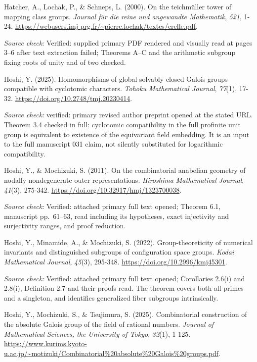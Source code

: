 \documentclass[10pt,a4paper]{article}
\begin{document}
Hatcher, A., Lochak, P., \& Schneps, L. (2000). On the teichm\"{u}ller tower of mapping class groups. \emph{Journal f\"{u}r die reine und angewandte Mathematik}, \emph{521}, 1-24. \url{https://webusers.imj-prg.fr/~pierre.lochak/textes/crelle.pdf}.

\emph{Source check:} Verified: supplied primary PDF rendered and visually read at pages 3--6 after text extraction failed; Theorems A--C and the arithmetic subgroup fixing roots of unity and of two checked.

Hoshi, Y. (2025). Homomorphisms of global solvably closed Galois groups compatible with cyclotomic characters. \emph{Tohoku Mathematical Journal}, \emph{77}(1), 17-32. \url{https://doi.org/10.2748/tmj.20230414}.

\emph{Source check:} verified: primary revised author preprint opened at the stated URL. Theorem 3.4 checked in full: cyclotomic compatibility in the full profinite unit group is equivalent to existence of the equivariant field embedding. It is an input to the full manuscript 031 claim, not silently substituted for logarithmic compatibility.

Hoshi, Y., \& Mochizuki, S. (2011). On the combinatorial anabelian geometry of nodally nondegenerate outer representations. \emph{Hiroshima Mathematical Journal}, \emph{41}(3), 275-342. \url{https://doi.org/10.32917/hmj/1323700038}.

\emph{Source check:} Verified: attached primary full text opened; Theorem 6.1, manuscript pp.~61--63, read including its hypotheses, exact injectivity and surjectivity ranges, and proof reduction.

Hoshi, Y., Minamide, A., \& Mochizuki, S. (2022). Group-theoreticity of numerical invariants and distinguished subgroups of configuration space groups. \emph{Kodai Mathematical Journal}, \emph{45}(3), 295-348. \url{https://doi.org/10.2996/kmj45301}.

\emph{Source check:} Verified: attached primary full text opened; Corollaries 2.6(i) and 2.8(i), Definition 2.7 and their proofs read. The theorem covers both all primes and a singleton, and identifies generalized fiber subgroups intrinsically.

Hoshi, Y., Mochizuki, S., \& Tsujimura, S. (2025). Combinatorial construction of the absolute Galois group of the field of rational numbers. \emph{Journal of Mathematical Sciences, the University of Tokyo}, \emph{32}(1), 1-125. \url{https://www.kurims.kyoto-u.ac.jp/~motizuki/Combinatorial\%20absolute\%20Galois\%20groups.pdf}.
\end{document}
